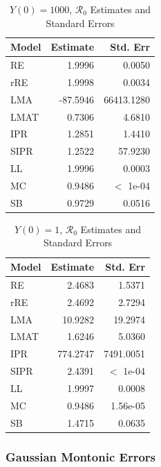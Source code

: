 \documentclass[12pt]{article}
\newcommand{\rr}{\ensuremath{\mathcal{R}_0}}
\begin{document}
\begin{table}[H]
	
	\centering
	\begin{tabular}[t]{l|r|r}
		\hline
		Model & Estimate & Std. Err\\
		\hline
		RE & 1.9996 & 0.0050\\
		\hline
		rRE & 1.9998 & 0.0034\\
		\hline
		LMA & -87.5946 & 66413.1280\\
		\hline
		LMAT & 0.7306 & 4.6810\\
		\hline
		IPR & 1.2851 & 1.4410\\
		\hline
		SIPR & 1.2522 & 57.9230\\
		\hline
		LL & 1.9996 & 0.0003 \\
		\hline
		MC & 0.9486 & $<$ 1e-04\\
		\hline
		SB & 0.9729 & 0.0516\\
		\hline
	\end{tabular}
        \caption{$Y(0) = 1000$, $\rr$ Estimates and Standard Errors}\label{tab:inits-res1}
\end{table}

\begin{table}[H]
	
	\centering
	\begin{tabular}[t]{l|r|r}
		\hline
		Model & Estimate & Std. Err\\
		\hline
		RE & 2.4683 & 1.5371\\
		\hline
		rRE & 2.4692 & 2.7294 \\
		\hline
		LMA & 10.9282 & 19.2974 \\
		\hline
		LMAT & 1.6246 & 5.0360\\
		\hline
		IPR & 774.2747 & 7491.0051 \\
		\hline
		SIPR & 2.4391 & $<$ 1e-04 \\
		\hline
		LL & 1.9997 & 0.0008\\
		\hline
		MC & 0.9486 & 1.56e-05\\
		\hline
		SB & 1.4715 & 0.0635\\
		\hline
	\end{tabular}
        \caption{$Y(0) = 1$, $\rr$ Estimates and Standard Errors}\label{tab:inits-res2}
\end{table}

\subsubsection{Gaussian Montonic Errors}
\end{document}
